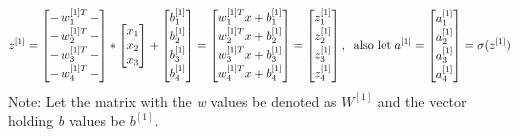 \documentclass[11pt, a4paper]{article}
\begin{document}
\begin{spacing}{1.1}
	$$ z^{[1]} = \begin{bmatrix} -\, w_1^{[1]T}\, - \vspace*{.5mm} \\ -\, w_2^{[1]T}\, - \vspace*{.5mm} \\ -\, w_3^{[1]T}\, - \vspace*{.5mm} \\ -\, w_4^{[1]T}\, - \vspace*{.5mm} \end{bmatrix} * \begin{bmatrix} x_1 \\ x_2 \\ x_3 \end{bmatrix} + \begin{bmatrix} b_1^{[1]} \vspace*{.5mm}\\ b_2^{[1]} \vspace*{.5mm}\\ b_3^{[1]} \vspace*{.5mm}\\ b_4^{[1]} \vspace*{.5mm}\\  \end{bmatrix} = \begin{bmatrix} w_1^{[1]T}x + b_1^{[1]} \vspace*{.5mm} \\ w_2^{[1]T}x + b_2^{[1]}  \vspace*{.5mm} \\ w_3^{[1]T}x + b_3^{[1]} \vspace*{.5mm} \\ w_4^{[1]T}x + b_4^{[1]}  \vspace*{.5mm} \end{bmatrix} = \begin{bmatrix} z_1^{[1]} \vspace*{.5mm}\\ z_2^{[1]} \vspace*{.5mm}\\ z_3^{[1]} \vspace*{.5mm}\\ z_4^{[1]} \vspace*{.5mm}\\  \end{bmatrix},\;\; \text{also let}\; a^{[1]} = \begin{bmatrix} a_1^{[1]} \vspace*{.5mm}\\ a_2^{[1]} \vspace*{.5mm}\\ a_3^{[1]} \vspace*{.5mm}\\ a_4^{[1]}  \end{bmatrix} = \sigma(z^{[1]}) $$
	Note: Let the matrix with the \textit{w} values be denoted as $W^{[1]}$ and the vector holding \textit{b} values be $b^{[1]}$. \newpage


\end{spacing}
\end{document}
